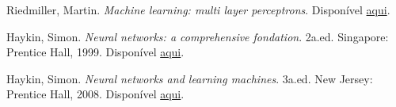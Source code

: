 \documentclass[12pt,a4paper]{article}
\begin{document}

\begin{thebibliography}{9}	
Riedmiller, Martin. \textit{Machine learning: multi layer perceptrons}. Disponível \href{http://ml.informatik.uni-freiburg.de/former/_media/documents/teaching/ss09/ml/mlps.pdf}{aqui}.


Haykin, Simon. \textit{Neural networks: a comprehensive fondation}. 2a.ed. Singapore: Prentice Hall, 1999. 
Disponível \href{https://www.researchgate.net/profile/Ashraf_Khalaf3/post/Does_anyone_have_current_information_on_back-propagation_in_artificial_neural_networks/attachment/59d621a279197b8077980002/AS%3A297484992696331%401447937358281/download/Neural+Networks+-+A+Comprehensive+Foundation+-+Simon+Haykin.pdf}{aqui}.

Haykin, Simon. \textit{Neural networks and learning machines}. 3a.ed. New Jersey: Prentice Hall, 2008. Disponível 
\href{http://dai.fmph.uniba.sk/courses/NN/haykin.neural-networks.3ed.2009.pdf}{aqui}. 



\end{thebibliography}
\end{document}
